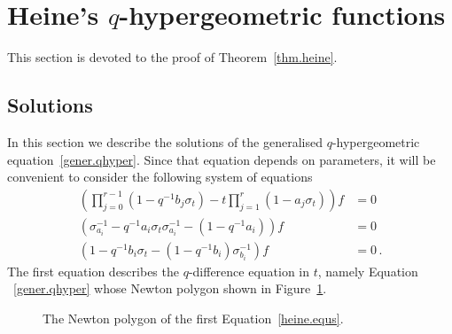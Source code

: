 \documentclass[12pt,reqno]{amsart}
\theoremstyle{definition}
\def\be{\begin{equation}}
\def\ee{\end{equation}}
\begin{document}
\section{Heine's $q$-hypergeometric functions}
\label{sec.heine}

This section is devoted to the proof of Theorem~\ref{thm.heine}.

\subsection{Solutions}

In this section we describe the solutions of the generalised $q$-hypergeometric
equation~\eqref{gener.qhyper}. Since that equation depends on parameters, it will
be convenient to consider the following system of equations
\be
\label{heine.equs}
\begin{aligned}
  \left(\prod_{j=0}^{r-1}(1-q^{-1}b_{j}\sigma_{t})-t\prod_{j=1}^{r}(1-a_{j}\sigma_{t})
  \right)f
  &=0\\
  \left(\sigma_{a_{i}}^{-1}-q^{-1}a_{i}\sigma_{t}\sigma_{a_{i}}^{-1}-(1-q^{-1}a_{i})
  \right)f
  &=0\\
  \left(1-q^{-1}b_{i}\sigma_{t}-(1-q^{-1}b_{i})\sigma_{b_{i}}^{-1}\right)f
  &=0\,.
\end{aligned}
\ee
The first equation describes the $q$-difference equation in $t$, namely Equation
~\eqref{gener.qhyper} whose Newton polygon shown in Figure~\ref{f.heine}.

\begin{figure}[!htpb]
\begin{center}
\caption{The Newton polygon of the first Equation~\eqref{heine.equs}.}
\label{f.heine}
\end{center}
\end{figure}
\end{document}
